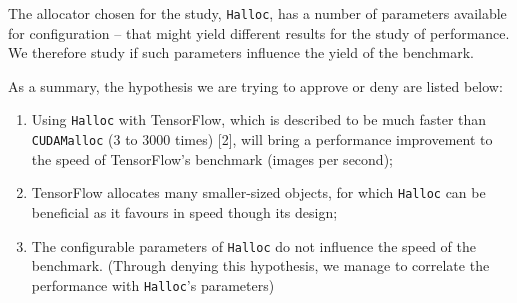 \documentclass[12pt,twoside]{article}
\begin{document}
The allocator chosen for the study, \texttt{Halloc}, has a number of parameters available for configuration -- that might yield different results for the study of performance. We therefore study if such parameters influence the yield of the benchmark.

As a summary, the hypothesis we are trying to approve or deny are listed below:






\begin{enumerate}
\item Using \texttt{Halloc} with TensorFlow, which is described to be much faster than \texttt{CUDAMalloc} (3 to 3000 times) [2], will bring a performance improvement to the speed of TensorFlow's benchmark (images per second);
\item TensorFlow allocates many smaller-sized objects, for which \texttt{Halloc} can be beneficial as it favours in speed though its design;
\item The configurable parameters of \texttt{Halloc} do not influence the speed of the benchmark. (Through denying this hypothesis, we manage to correlate the performance with \texttt{Halloc}'s parameters)
\end{enumerate}
\end{document}
